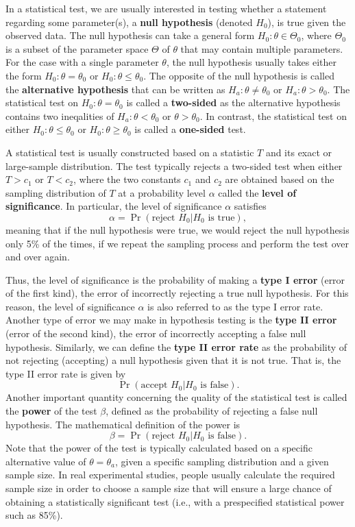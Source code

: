 \documentclass[]{book}
\theoremstyle{definition}
\theoremstyle{definition}
\theoremstyle{definition}
\theoremstyle{remark}
\begin{document}
In a statistical test, we are usually interested in testing whether a
statement regarding some parameter(s), a \textbf{null hypothesis}
(denoted \(H_0\)), is true given the observed data. The null hypothesis
can take a general form \(H_0:\theta\in\Theta_0\), where \(\Theta_0\) is
a subset of the parameter space \(\Theta\) of \(\theta\) that may
contain multiple parameters. For the case with a single parameter
\(\theta\), the null hypothesis usually takes either the form
\(H_0:\theta=\theta_0\) or \(H_0:\theta\leq\theta_0\). The opposite of
the null hypothesis is called the \textbf{alternative hypothesis} that
can be written as \(H_a:\theta\neq\theta_0\) or \(H_a:\theta>\theta_0\).
The statistical test on \(H_0:\theta=\theta_0\) is called a
\textbf{two-sided} as the alternative hypothesis contains two
ineqalities of \(H_a:\theta<\theta_0\) or \(\theta>\theta_0\). In
contrast, the statistical test on either \(H_0:\theta\leq\theta_0\) or
\(H_0:\theta\geq\theta_0\) is called a \textbf{one-sided} test.

A statistical test is usually constructed based on a statistic \(T\) and
its exact or large-sample distribution. The test typically rejects a
two-sided test when either \(T > c_1\) or \(T < c_2\), where the two
constants \(c_1\) and \(c_2\) are obtained based on the sampling
distribution of \(T\) at a probability level \(\alpha\) called the
\textbf{level of significance}. In particular, the level of significance
\(\alpha\) satisfies
\[\alpha=\Pr(\mbox{reject }H_0|H_0\mbox{ is true}),\] meaning that if
the null hypothesis were true, we would reject the null hypothesis only
5\% of the times, if we repeat the sampling process and perform the test
over and over again.

Thus, the level of significance is the probability of making a
\textbf{type I error} (error of the first kind), the error of
incorrectly rejecting a true null hypothesis. For this reason, the level
of significance \(\alpha\) is also referred to as the type I error rate.
Another type of error we may make in hypothesis testing is the
\textbf{type II error} (error of the second kind), the error of
incorrectly accepting a false null hypothesis. Similarly, we can define
the \textbf{type II error rate} as the probability of not rejecting
(accepting) a null hypothesis given that it is not true. That is, the
type II error rate is given by
\[\Pr(\mbox{accept }H_0|H_0\mbox{ is false}).\] Another important
quantity concerning the quality of the statistical test is called the
\textbf{power} of the test \(\beta\), defined as the probability of
rejecting a false null hypothesis. The mathematical definition of the
power is \[\beta=\Pr(\mbox{reject }H_0|H_0\mbox{ is false}).\] Note that
the power of the test is typically calculated based on a specific
alternative value of \(\theta=\theta_a\), given a specific sampling
distribution and a given sample size. In real experimental studies,
people usually calculate the required sample size in order to choose a
sample size that will ensure a large chance of obtaining a statistically
significant test (i.e., with a prespecified statistical power such as
85\%).
\end{document}
